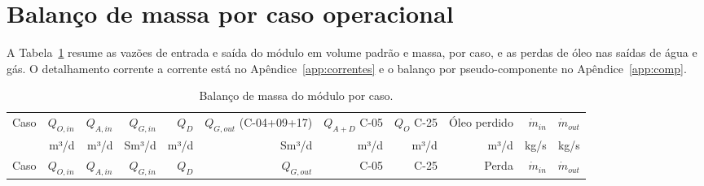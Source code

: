 \documentclass[11pt,a4paper]{article}
\numberwithin{equation}{section}
\numberwithin{table}{section}
\numberwithin{figure}{section}
\begin{document}
\section{Balanço de massa por caso operacional}\label{sec:massacaso}
A Tabela~\ref{tab:massacaso} resume as vazões de entrada e saída do módulo em volume padrão e massa, por caso, e as perdas de óleo nas saídas de água e gás. O detalhamento corrente a corrente está no Apêndice~\ref{app:correntes} e o balanço por pseudo-componente no Apêndice~\ref{app:comp}.
\begin{landscape}\small
\begin{longtable}{rrrrrrrrrrr}
\caption{Balanço de massa do módulo por caso.}\label{tab:massacaso}\\\toprule
Caso & $Q_{O,in}$ & $Q_{A,in}$ & $Q_{G,in}$ & $Q_D$ & $Q_{G,out}$ (C-04+09+17) & $Q_{A+D}$ C-05 & $Q_O$ C-25 & Óleo perdido & $\dot m_{in}$ & $\dot m_{out}$\\
 & m³/d & m³/d & Sm³/d & m³/d & Sm³/d & m³/d & m³/d & m³/d & kg/s & kg/s\\\midrule\endfirsthead
\toprule Caso & $Q_{O,in}$ & $Q_{A,in}$ & $Q_{G,in}$ & $Q_D$ & $Q_{G,out}$ & C-05 & C-25 & Perda & $\dot m_{in}$ & $\dot m_{out}$\\\midrule\endhead


\end{longtable}
\end{landscape}
\end{document}
